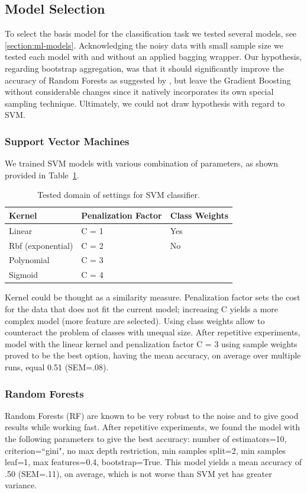 	\subsection{Model Selection}
	To select the basis model for the classification task we tested several models, see \cref{section:ml-models}. Acknowledging the noisy data with small sample size we tested each model with and without an applied bagging wrapper. Our hypothesis, regarding bootstrap aggregation, was that it should significantly improve the accuracy of Random Forests as suggested by , but leave the Gradient Boosting without considerable changes since it natively incorporates its own special sampling technique. Ultimately, we could not draw hypothesis with regard to SVM. 
	
	\subsubsection{Support Vector Machines}
	We trained SVM models with various combination of parameters, as shown provided in Table~\ref{tab:svm-pars}. 
	
	\begin{table}[h]
		\centering
		\caption{Tested domain of settings for SVM classifier.}
		\label{tab:svm-pars}
		\begin{tabular}{lll}
			\hline
			\abovespace\belowspace
			Kernel	& Penalization Factor & Class Weights\\
			\hline
			Linear	& C = 1 & Yes\\
			Rbf (exponential) & C = 2 & No\\
			Polynomial & C = 3 &\\
			Sigmoid & C = 4 &\\		
			\hline
		\end{tabular}
	\end{table}
	
	Kernel could be thought as a similarity measure. Penalization factor sets the cost for the data that does not fit the current model; increasing C yields a more complex model (more feature are selected). Using class weights allow to counteract the problem of classes with unequal size. After repetitive experiments, model with the linear kernel and penalization factor C = 3 using sample weights proved to be the best option, having the mean accuracy, on average over multiple runs, equal 0.51 (SEM=.08). 
	
	\subsubsection{Random Forests}
	Random Forests (RF) are known to be very robust to the noise and to give good results while working fast.
	After repetitive experiments, we found the model with the following parameters to give the best accuracy: number of estimators=10, criterion=``gini", no max depth restriction, min samples split=2, min samples leaf=1, max features=0.4, bootstrap=True. This model yields a mean accuracy of .50 (SEM=.11), on average, which is not worse than SVM yet has greater variance. 
	
